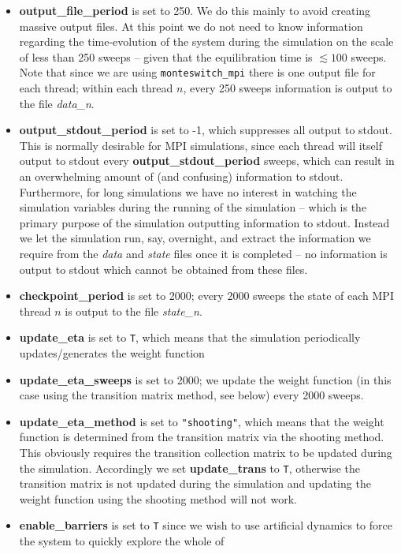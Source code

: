 \documentclass{report}
\begin{document}
\begin{itemize}
\item \textbf{output\_file\_period} is set to 250. We do this mainly to avoid creating massive output files. At this point we do not need to know 
  information regarding the time-evolution of the system during the simulation on the scale of less than 250 sweeps -- given that the equilibration time is
  $\lesssim 100$ sweeps. Note that since we are using \texttt{monteswitch\_mpi} there is one output file for each thread; within each thread $n$, every 
  250 sweeps information is output to the file \emph{data\_n}.
\item \textbf{output\_stdout\_period} is set to -1, which suppresses all output to stdout. This is normally desirable for MPI simulations, since each thread 
  will itself output to stdout every \textbf{output\_stdout\_period} sweeps, which can result in an overwhelming amount of (and confusing) information to 
  stdout. 
  Furthermore, for long simulations we have no interest in watching the simulation variables during the running of the simulation -- which is the primary
  purpose of the simulation outputting information to stdout. Instead we let the simulation run, say, overnight, and extract the information we require
  from the \emph{data} and \emph{state} files once it is completed -- no information is output to stdout which cannot be obtained from these files.
\item \textbf{checkpoint\_period} is set to 2000; every 2000 sweeps the state of each MPI thread $n$ is output to the file \emph{state\_n}.
\item \textbf{update\_eta} is set to \texttt{T}, which means that the simulation periodically updates/generates the weight function
\item \textbf{update\_eta\_sweeps} is set to 2000; we update the weight function (in this case using the transition matrix method, see below) every 2000 
  sweeps.
\item \textbf{update\_eta\_method} is set to \verb|"shooting"|, which means that the weight function is determined from the transition matrix via the 
  shooting method. This obviously requires the transition collection matrix to be updated during the simulation. 
  Accordingly we set \textbf{update\_trans} to \texttt{T}, otherwise
  the transition matrix is not updated during the simulation and updating the weight function using the shooting method will not work.
\item \textbf{enable\_barriers} is set to \texttt{T} since we wish to use artificial dynamics to force the system to quickly explore the whole of

\end{itemize}
\end{document}

